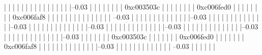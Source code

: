             |          |          |          |          |          |          |          |          
            |          |          |          |          |          |          |          |--0.03%
            |          |          |          |          |          |          |          |          0xc003503c
            |          |          |          |          |          |          |          |          0xc006fed0
            |          |          |          |          |          |          |          |          0xc006faf8
            |          |          |          |          |          |          |          |          
            |          |          |          |          |          |          |           --0.03%
            |          |          |          |          |          |          |          
            |          |          |          |          |          |          |--0.03%
            |          |          |          |          |          |          |          
            |          |          |          |          |          |          |--0.03%
            |          |          |          |          |          |          |          
            |          |          |          |          |          |          |--0.03%
            |          |          |          |          |          |          |          
            |          |          |          |          |          |          |--0.03%
            |          |          |          |          |          |          |          
            |          |          |          |          |          |          |--0.03%
            |          |          |          |          |          |          |          
            |          |          |          |          |          |          |--0.03%
            |          |          |          |          |          |          |          0xc003503c
            |          |          |          |          |          |          |          0xc006fed0
            |          |          |          |          |          |          |          0xc006faf8
            |          |          |          |          |          |          |          
            |          |          |          |          |          |          |--0.03%
            |          |          |          |          |          |          |          
            |          |          |          |          |          |           --0.03%
            |          |          |          |          |          |          
